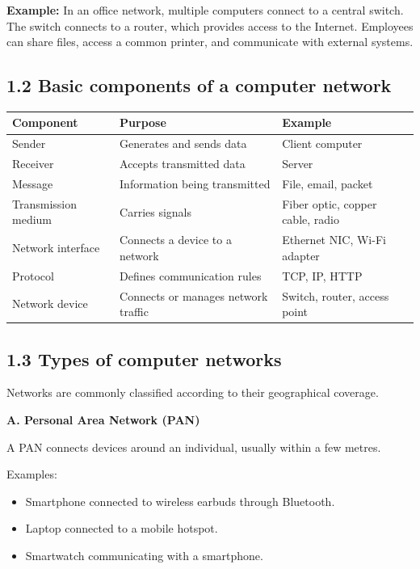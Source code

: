 \textbf{Example:} In an office network, multiple computers connect to a central switch. The switch connects to a router, which provides access to the Internet. Employees can share files, access a common printer, and communicate with external systems.

\subsection{1.2 Basic components of a computer network}

\begin{table}[htbp]
\centering
\begin{tabularx}{\textwidth}{p{4.2cm} X X}
\toprule
\textbf{Component} & \textbf{Purpose} & \textbf{Example} \\
\midrule
Sender & Generates and sends data & Client computer \\
Receiver & Accepts transmitted data & Server \\
Message & Information being transmitted & File, email, packet \\
Transmission medium & Carries signals & Fiber optic, copper cable, radio \\
Network interface & Connects a device to a network & Ethernet NIC, Wi-Fi adapter \\
Protocol & Defines communication rules & TCP, IP, HTTP \\
Network device & Connects or manages network traffic & Switch, router, access point \\
\bottomrule
\end{tabularx}
\end{table}

\subsection{1.3 Types of computer networks}

Networks are commonly classified according to their geographical coverage.

\textbf{A. Personal Area Network (PAN)}

A PAN connects devices around an individual, usually within a few metres.

Examples:

\begin{itemize}
    \item Smartphone connected to wireless earbuds through Bluetooth.
    \item Laptop connected to a mobile hotspot.
    \item Smartwatch communicating with a smartphone.
\end{itemize}

